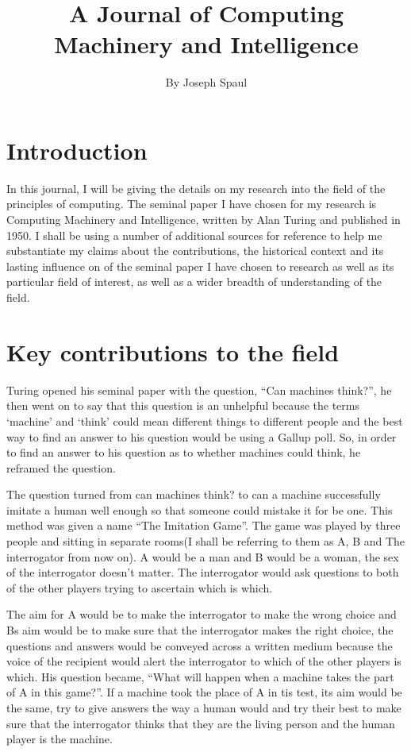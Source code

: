 \documentclass{article}
\title{A Journal of Computing Machinery and Intelligence}
\author{By Joseph Spaul}
\begin{document}
\maketitle

\section{Introduction}

In this journal, I will be giving the details on my research into the field of the principles of computing. 
The seminal paper I have chosen for my research is Computing Machinery and Intelligence, written by Alan Turing 
and published in 1950. I shall be using a number of additional sources for reference to help me substantiate my 
claims about the contributions, the historical context and its lasting influence on of the seminal paper I have 
chosen to research as well as its particular field of interest, as well as a wider breadth of understanding of 
the field.

\section{Key contributions to the field}

Turing opened his seminal paper with the question, “Can machines think?”, he then went on to say that this 
question is an unhelpful because the terms ‘machine’ and ‘think’ could mean different things to different 
people and the best way to find an answer to his question would be using a Gallup poll. So, in order to find 
an answer to his question as to whether machines could think, he reframed the question. 

The question turned from can machines think? to can a machine successfully imitate a human well enough so that 
someone could mistake it for be one. This method was given a name “The Imitation Game”. The game was played by 
three people and sitting in separate rooms(I shall be referring to them as A, B and The interrogator from now 
on). A would be a man and B would be a woman, the sex of the interrogator doesn’t matter. The interrogator would 
ask questions to both of the other players trying to ascertain which is which. 

The aim for A would be to make the interrogator to make the wrong choice and Bs aim would be to make sure that the  
interrogator makes the right choice, the questions and answers would be conveyed across a written medium because 
the voice of the recipient would alert the interrogator to which of the other players is which. His question 
became, “What will happen when a machine takes the part of A in this game?”. If a machine took the place of A in 
tis test, its aim would be the same, try to give answers the way a human would and try their best to make sure that 
the interrogator thinks that they are the living person and the human player is the machine. 
\end{document}
